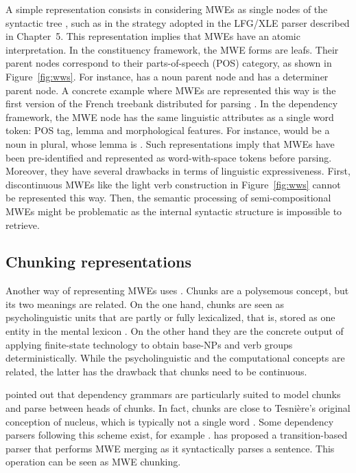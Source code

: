 \documentclass[output=paper]{LSP/langsci}
\begin{document}
A simple representation consists in considering MWEs as single nodes of the syntactic tree \citep{sag02}, such as in the strategy adopted in the LFG/XLE parser described in Chapter~5. This  representation implies that MWEs have an atomic interpretation. In the constituency framework, the MWE forms are leafs. Their parent nodes correspond to their parts-of-speech (POS) category, as shown in Figure~\ref{fig:wws}. For instance,  has a noun parent node and  has a determiner parent node. 
A concrete example where MWEs are represented this way is the first version of the French treebank distributed for parsing \citep{candito:2009}. 
In the dependency framework, the MWE node has the same linguistic attributes as a single word token: POS tag, lemma and morphological features. For instance,  would be a noun in plural, whose lemma is . Such representations imply that MWEs have been pre-identified and represented as word-with-space tokens before parsing. Moreover, they have several drawbacks in terms of linguistic expressiveness. First, discontinuous MWEs like the light verb construction  in Figure~\ref{fig:wws} cannot be represented this way. Then, the semantic processing of semi-compositional MWEs might be problematic as the internal syntactic structure is impossible to retrieve.%

\subsection {Chunking representations}
\label{ssec:chunking}

Another way of representing MWEs uses . 
Chunks are a polysemous concept, but its two meanings are related. 
On the one hand, chunks are seen as psycholinguistic units that are partly or fully lexicalized, that is, stored as one entity in the mental lexicon \citep{miller56,pawley-syder83,tomasello98,wray08}. 
On the other hand they are 
the concrete output of applying finite-state technology to obtain base-NPs and verb groups deterministically. While the psycholinguistic and the computational concepts are related, the latter has the drawback that chunks need to be continuous.

\citet{abney1991procedure} pointed out that dependency grammars are particularly suited to model chunks and parse between heads of chunks. 
In fact, chunks are close to Tesnière's original conception of nucleus, which is typically not a single word \citep{tesniere:1959}. Some dependency parsers following this scheme exist, for example \citet{schneiderPhd}. \citet{nivre:2014} has proposed a transition-based parser that performs MWE merging as it syntactically parses a sentence. This operation can be seen as MWE chunking. 
\end{document}
